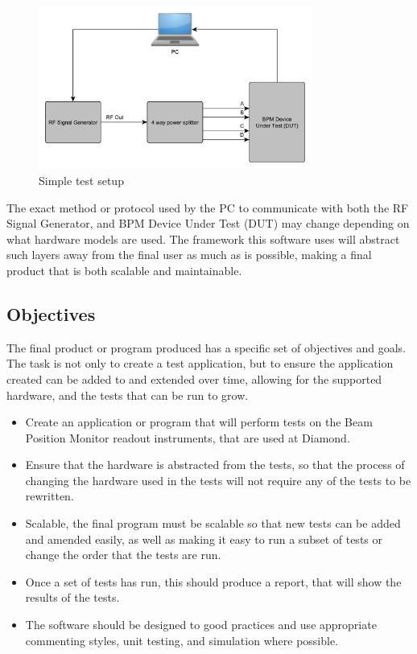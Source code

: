 \documentclass[a4paper, 11pt]{article}
\begin{document}
\begin{figure}[H]
	\centering
	\includegraphics[width=0.8\textwidth]{SimpleSetup.pdf}
	\caption{Simple test setup}
    \label{fig:setup}
\end{figure}

The exact method or protocol used by the PC to communicate with both the RF Signal Generator, and BPM Device Under Test (DUT) may change depending on what hardware models are used. The framework this software uses will abstract such layers away from the final user as much as is possible, making a final product that is both scalable and maintainable.  

\subsection{Objectives}\label{sec:objectives}
The final product or program produced has a specific set of objectives and goals. The task is not only to create a test application, but to ensure the application created can be added to and extended over time, allowing for the supported hardware, and the tests that can be run to grow. 
\begin{itemize}
  \item Create an application or program that will perform tests on the Beam Position Monitor readout instruments, that are used at Diamond. 
  \item Ensure that the hardware is abstracted from the tests, so that the process of changing the hardware used in the tests will not require any of the tests to be rewritten. 
  \item Scalable, the final program must be scalable so that new tests can be added and amended easily, as well as making it easy to run a subset of tests or change the order that the tests are run.
  \item Once a set of tests has run, this should produce a report, that will show the results of the tests. 
  \item The software should be designed to good practices and use appropriate commenting styles, unit testing, and simulation where possible. 
    
\end{itemize}
\end{document}
